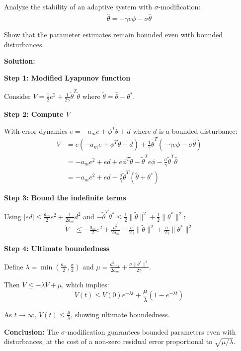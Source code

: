 \begin{example}
\label{ex:sigma_mod}
Analyze the stability of an adaptive system with $\sigma$-modification:
\begin{equation}
\dot{\hat{\theta}} = -\gamma e \phi - \sigma \hat{\theta}
\end{equation}

Show that the parameter estimates remain bounded even with bounded disturbances.

\textbf{Solution:}

\textbf{Step 1: Modified Lyapunov function}

Consider $V = \frac{1}{2}e^2 + \frac{1}{2\gamma}\tilde{\theta}^T\tilde{\theta}$ where $\tilde{\theta} = \hat{\theta} - \theta^*$.

\textbf{Step 2: Compute $\dot{V}$}

With error dynamics $\dot{e} = -a_m e + \phi^T \tilde{\theta} + d$ where $d$ is a bounded disturbance:
\begin{align}
\dot{V} &= e(-a_m e + \phi^T \tilde{\theta} + d) + \frac{1}{\gamma}\tilde{\theta}^T(-\gamma e \phi - \sigma \hat{\theta}) \\
&= -a_m e^2 + ed + e\phi^T\tilde{\theta} - \tilde{\theta}^T e \phi - \frac{\sigma}{\gamma}\tilde{\theta}^T\hat{\theta} \\
&= -a_m e^2 + ed - \frac{\sigma}{\gamma}\tilde{\theta}^T(\tilde{\theta} + \theta^*)
\end{align}

\textbf{Step 3: Bound the indefinite terms}

Using $|ed| \leq \frac{a_m}{2}e^2 + \frac{1}{2a_m}d^2$ and $-\tilde{\theta}^T\theta^* \leq \frac{1}{2}\|\tilde{\theta}\|^2 + \frac{1}{2}\|\theta^*\|^2$:
\begin{align}
\dot{V} &\leq -\frac{a_m}{2}e^2 + \frac{d^2}{2a_m} - \frac{\sigma}{2\gamma}\|\tilde{\theta}\|^2 + \frac{\sigma}{2\gamma}\|\theta^*\|^2
\end{align}

\textbf{Step 4: Ultimate boundedness}

Define $\lambda = \min\left(\frac{a_m}{2}, \frac{\sigma}{2}\right)$ and $\mu = \frac{d_{max}^2}{2a_m} + \frac{\sigma\|\theta^*\|^2}{2\gamma}$.

Then $\dot{V} \leq -\lambda V + \mu$, which implies:
\begin{equation}
V(t) \leq V(0)e^{-\lambda t} + \frac{\mu}{\lambda}(1 - e^{-\lambda t})
\end{equation}

As $t \to \infty$, $V(t) \leq \frac{\mu}{\lambda}$, showing ultimate boundedness.

\textbf{Conclusion:} The $\sigma$-modification guarantees bounded parameters even with disturbances, at the cost of a non-zero residual error proportional to $\sqrt{\mu/\lambda}$.
\end{example}

